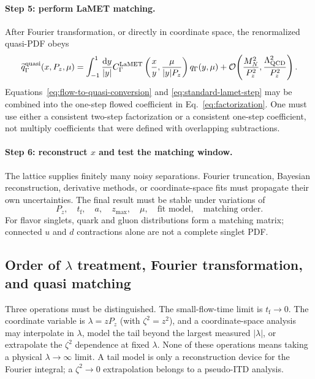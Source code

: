 \documentclass[11pt]{article}
\numberwithin{equation}{section}
\newcommand{\dd}{\mathrm{d}}
\newcommand{\cO}{\mathcal{O}}
\newcommand{\tf}{t_{\mathrm f}}
\begin{document}
\paragraph{Step 5: perform LaMET matching.}
After Fourier transformation, or directly in coordinate space, the
renormalized quasi-PDF obeys
\begin{equation}
  \widetilde q_{\Gamma}^{\rm quasi}(x,P_z,\mu)
  =
  \int_{-1}^{1}\frac{\dd y}{|y|}
  C_{\Gamma}^{\rm LaMET}
  \left(\frac{x}{y},\frac{\mu}{|y|P_z}\right)
  q_{\Gamma}(y,\mu)
  +\cO\!\left(
    \frac{M_N^2}{P_z^2},
    \frac{\Lambda_{\rm QCD}^2}{P_z^2}
  \right).
  \label{eq:standard-lamet-step}
\end{equation}
Equations~\eqref{eq:flow-to-quasi-conversion} and
\eqref{eq:standard-lamet-step} may be combined into the one-step flowed
coefficient in Eq.~\eqref{eq:factorization}.  One must use either a consistent
two-step factorization or a consistent one-step coefficient, not multiply
coefficients that were defined with overlapping subtractions.

\paragraph{Step 6: reconstruct \(x\) and test the matching window.}
The lattice supplies finitely many noisy separations.  Fourier truncation,
Bayesian reconstruction, derivative methods, or coordinate-space fits must
propagate their own uncertainties.  The final result must be stable under
variations of
\begin{equation}
  P_z,\quad \tf,\quad a,\quad z_{\max},\quad
  \mu,\quad \text{fit model},\quad \text{matching order}.
  \label{eq:matching-systematic-variations}
\end{equation}
For flavor singlets, quark and gluon distributions form a matching matrix;
connected \(u\) and \(d\) contractions alone are not a complete singlet PDF.

\subsection{Order of $\lambda$ treatment, Fourier transformation, and quasi matching}
\label{sec:lambda-fourier-order}

Three operations must be distinguished.  The small-flow-time limit is
$\tf\to0$.  The coordinate variable is $\lambda=zP_z$ (with $\zeta^2=z^2$),
and a coordinate-space analysis may interpolate in $\lambda$, model the tail
beyond the largest measured $|\lambda|$, or extrapolate the $\zeta^2$
dependence at fixed $\lambda$.  None of these operations means taking a
physical $\lambda\to\infty$ limit.  A tail model is only a reconstruction
device for the Fourier integral; a $\zeta^2\to0$ extrapolation belongs to a
pseudo-ITD analysis.
\end{document}
